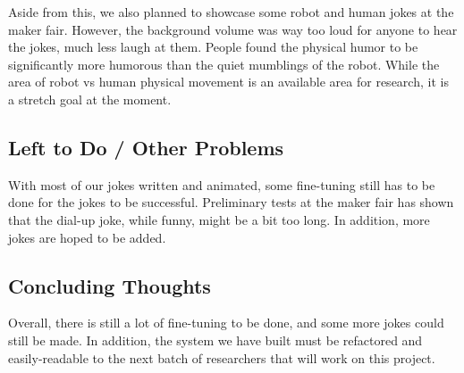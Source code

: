 \documentclass[onecolumn, draftclsnofoot,10pt, compsoc]{IEEEtran}
\begin{document}
Aside from this, we also planned to showcase some robot and human jokes at the maker fair. However, the background volume was way too loud for anyone to hear the jokes, much less laugh at them. People found the physical humor to be significantly more humorous than the quiet mumblings of the robot. While the area of robot vs human physical movement is an available area for research, it is a stretch goal at the moment.

\subsection{Left to Do / Other Problems}
With most of our jokes written and animated, some fine-tuning still has to be done for the jokes to be successful. Preliminary tests at the maker fair has shown that the dial-up joke, while funny, might be a bit too long. In addition, more jokes are hoped to be added.


\subsection{Concluding Thoughts}
Overall, there is still a lot of fine-tuning to be done, and some more jokes could still be made. In addition, the system we have built must be refactored and easily-readable to the next batch of researchers that will work on this project.
\end{document}
